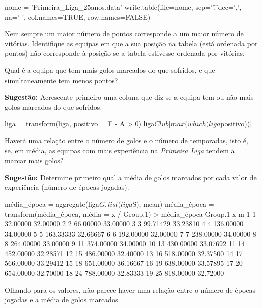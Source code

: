 \documentclass{exam}
\begin{document}
\begin{questions}
\begin{solution}
	\begin{rcode}
		nome = 'Primeira_Liga_25anos.data'
		write.table(file=nome, sep='\t', dec=',', na='-', col.names=TRUE, row.names=FALSE)
	\end{rcode}
\end{solution}

\question Nem sempre um maior número de pontos corresponde a um maior número de vitórias. Identifique as equipas em que a sua posição na tabela (está ordenada por pontos) não corresponde à posição se a tabela estivesse ordenada por vitórias.

\begin{solution}
\end{solution}

\question Qual é a equipa que tem mais golos marcados do que sofridos, e que simultaneamente tem menos pontos?

\textbf{Sugestão:} Acrescente primeiro uma coluna que diz se a equipa tem ou não mais golos marcados do que sofridos.

\begin{solution}
	\begin{rcode}
		liga = transform(liga, positivo = F - A > 0)
		liga$Club[max(which(liga$positivo))]
	\end{rcode}
\end{solution}

\question Haverá uma relação entre o número de golos e o número de temporadas, isto é, se, em média, as equipas com mais experiência na \textit{Primeira Liga} tendem a marcar mais golos?

\textbf{Sugestão:} Determine primeiro qual a média de golos marcados por cada valor de experiência (número de épocas jogadas).

\begin{solution}
	\begin{rcode}
		média_época = aggregate(liga$G, list(liga$S), mean)
		média_época = transform(média_época, média = x / Group.1)
		> média_época
		Group.1         x        m
		1        1  32.00000 32.00000
		2        2  66.00000 33.00000
		3        3  99.71429 33.23810
		4        4 136.00000 34.00000
		5        5 163.33333 32.66667
		6        6 192.00000 32.00000
		7        7 238.00000 34.00000
		8        8 264.00000 33.00000
		9       11 374.00000 34.00000
		10      13 430.00000 33.07692
		11      14 452.00000 32.28571
		12      15 486.00000 32.40000
		13      16 518.00000 32.37500
		14      17 566.00000 33.29412
		15      18 651.00000 36.16667
		16      19 638.00000 33.57895
		17      20 654.00000 32.70000
		18      24 788.00000 32.83333
		19      25 818.00000 32.72000
	\end{rcode}
	Olhando para os valores, não parece haver uma relação entre o número de épocas jogadas e a média de golos marcados.
	

\end{solution}
\end{questions}
\end{document}
